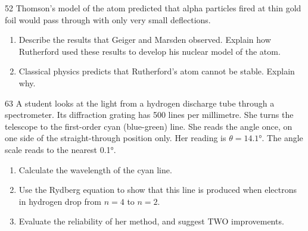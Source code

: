 \begin{practiceq}{5}{2}\label{pq:goldfoil}
Thomson's model of the atom predicted that alpha particles fired at thin gold foil would
pass through with only very small deflections.
\begin{enumerate}[label=(\alph*)]
  \item Describe the results that Geiger and Marsden observed. Explain how Rutherford used
        these results to develop his nuclear model of the atom. 
  \item Classical physics predicts that Rutherford's atom cannot be stable. Explain why.
\end{enumerate}
\end{practiceq}

\begin{practiceq}{6}{3}\label{pq:balmer}
A student looks at the light from a hydrogen discharge tube through a spectrometer. Its
diffraction grating has 500 lines per millimetre. She turns the telescope to the
first-order cyan (blue-green) line. She reads the angle once, on one side of the
straight-through position only. Her reading is $\theta = \ang{14.1}$. The angle scale reads
to the nearest \ang{0.1}.
\begin{enumerate}[label=(\alph*)]
  \item Calculate the wavelength of the cyan line. 
  \item Use the Rydberg equation to show that this line is produced when electrons in
        hydrogen drop from $n = 4$ to $n = 2$. 
  \item Evaluate the reliability of her method, and suggest TWO improvements.
\end{enumerate}
\end{practiceq}


